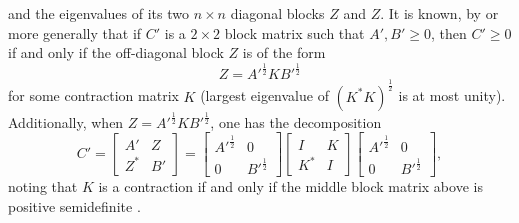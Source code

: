\documentclass[notitlepage, 10pt]{article}
\begin{document}
and the eigenvalues of its two $n\times n$ diagonal blocks $Z$ and $Z$.
It is known, by \cite[Theorem 7.7.9]{horn2012matrix} or more generally \cite[Theorem 5.11]{moslehian2019positivity} that if $C'$ is a $2\times 2$ block matrix such that $A',B' \geq 0$, then $C' \geq 0$ if and only if the off-diagonal block $Z$ is of the form
\begin{equation}
    Z = A'^{\frac{1}{2}} K B'^{\frac{1}{2}}
\end{equation}
for some contraction matrix $K$ (largest eigenvalue of $(K^{*}K)^{\frac{1}{2}}$ is at most unity).
Additionally, when $Z = A'^{\frac{1}{2}} K B'^{\frac{1}{2}}$, one has the decomposition
\begin{equation}
    C' = \begin{bmatrix}
        A' & Z \\
        Z^{*} & B'
    \end{bmatrix} 
    =
    \begin{bmatrix}
        A'^{\frac{1}{2}} & 0 \\
        0 & B'^{\frac{1}{2}}
    \end{bmatrix}
    \begin{bmatrix}
        I & K \\
        K^{*} & I
    \end{bmatrix}
    \begin{bmatrix}
        A'^{\frac{1}{2}} & 0 \\
        0 & B'^{\frac{1}{2}}
    \end{bmatrix},
\end{equation}
noting that $K$ is a contraction if and only if the middle block matrix above is positive semidefinite \cite[Lemma 5.10]{moslehian2019positivity}.
\end{document}
